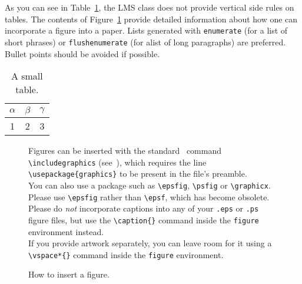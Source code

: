 \documentclass{lms}
\begin{document}
As you can see in Table~\ref{mytable}, the LMS class does not
provide vertical side rules on tables. The contents of
Figure~\ref{myfigure} provide detailed information about how one
can incorporate a figure into a paper. Lists generated with
\verb"enumerate" (for a list of short phrases) or \verb"flushenumerate" (for
a\break list of long paragraphs) are preferred. Bullet points should be avoided
if possible.
\begin{table}[b]\vspace*{-3ex}
\caption[]{A small table.} \label{mytable}
\begin{tabular}{ccc}
\hline
$\alpha$&$\beta$&$\gamma$\\
\hline
1&2&3\\
\hline
\end{tabular}
\end{table}

\begin{figure}
   \vspace*{8pt}%
   \begin{minipage}{8cm}
   Figures can be inserted with the standard \LaTeXe\ command
   \verb"\includegraphics" (see~\cite{Lamport}), which requires the line
   \verb"\usepackage{graphics}" to be present in the file's preamble.\\
   \hspace*{6pt} You can also use a package such as \verb"\epsfig",
   \verb"\psfig" or \verb"\graphicx". Please use \verb"\epsfig" rather than
   \verb"\epsf", which has become obsolete.\\
   \hspace*{6pt} Please do {\em not\/} incorporate captions into any of
   your {\tt .eps} or {\tt .ps} figure files, but use the \verb"\caption{}"
   command inside the {\tt figure} environment instead.\\
   \hspace*{6pt} If you provide artwork separately, you can leave room for
   it using a \verb"\vspace*{}" command inside the {\tt figure}
   environment.
   \end{minipage}
   \vspace*{8pt}
%
\caption{How to insert a figure.}
\label{myfigure}
\end{figure}
\end{document}

